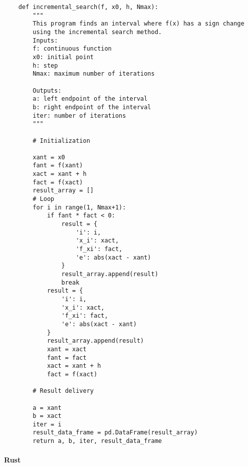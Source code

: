 \documentclass{article}
\begin{document}
            \begin{verbatim}
    def incremental_search(f, x0, h, Nmax):
        """
        This program finds an interval where f(x) has a sign change
        using the incremental search method.
        Inputs:
        f: continuous function
        x0: initial point
        h: step
        Nmax: maximum number of iterations

        Outputs:
        a: left endpoint of the interval
        b: right endpoint of the interval
        iter: number of iterations
        """

        # Initialization

        xant = x0
        fant = f(xant)
        xact = xant + h
        fact = f(xact)
        result_array = []
        # Loop
        for i in range(1, Nmax+1):
            if fant * fact < 0:
                result = {
                    'i': i,
                    'x_i': xact,
                    'f_xi': fact,
                    'e': abs(xact - xant)
                }
                result_array.append(result)
                break
            result = {
                'i': i,
                'x_i': xact,
                'f_xi': fact,
                'e': abs(xact - xant)
            }
            result_array.append(result)
            xant = xact
            fant = fact
            xact = xant + h
            fact = f(xact)

        # Result delivery

        a = xant
        b = xact
        iter = i
        result_data_frame = pd.DataFrame(result_array)
        return a, b, iter, result_data_frame
                    \end{verbatim}

    \paragraph{Rust}\label{paragraph:rust}
\end{document}
